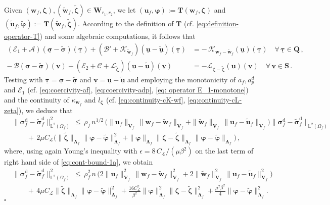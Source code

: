 \documentclass[11pt]{article}
\numberwithin{equation}{section}
\newcommand{\ds}{\displaystyle}
\newcommand{\bLambda}{{\boldsymbol\Lambda}}
\newcommand{\bsi}{{\boldsymbol\sigma}}
\newcommand{\bvarphi}{{\boldsymbol\varphi}}
\newcommand{\btau}{{\boldsymbol\tau}}
\newcommand{\bzeta}{{\boldsymbol\zeta}}
\newcommand{\ubsi}{\underline{\bsi}}
\newcommand{\ubtau}{\underline{\btau}}
\newcommand{\ubu}{\underline{\bu}}
\newcommand{\ubv}{\underline{\bv}}
\newcommand{\bv}{{\mathbf{v}}}
\newcommand{\bw}{{\mathbf{w}}}
\newcommand{\bu}{\mathbf{u}}
\newcommand{\0}{{\mathbf{0}}}
\def\bV{\mathbf{V}}
\def\bW{\mathbf{W}}
\def\bT{\mathbf{T}}
\def\bQ{\mathbf{Q}}
\def\bS{\mathbf{S}}
\newcommand\bbL{\mathbb{L}}
\newcommand{\cA}{\mathcal{A}}
\newcommand{\cB}{\mathcal{B}}
\newcommand{\cC}{\mathcal{C}}
\newcommand{\cE}{\mathcal{E}}
\newcommand{\cK}{\mathcal{K}}
\newcommand{\cL}{\mathcal{L}}
\def\rd{\mathrm{d}}
\def\wt{\widetilde}
\newenvironment{proof}{\noindent{\it Proof.}}{\hfill$\square$}
\numberwithin{equation}{section}
\begin{document}
\begin{proof}
Given $(\bw_f,\bzeta), (\wt{\bw}_f,\wt{\bzeta}) \in \bW_{r_1,r_2}$, we let $(\bu_f,\bvarphi) := \bT(\bw_f,\bzeta)$ and $(\wt{\bu}_f,\wt{\bvarphi}) := \bT(\wt{\bw}_f,\wt{\bzeta})$. 
According to the definition of $\bT$ (cf. \eqref{eq:definition-operator-T}) and some algebraic computations, it follows that
\begin{align}
(\cE_1 + \cA)(\ubsi - \wt{\bsi})(\ubtau) + (\cB' + \cK_{\wt{\bw}_f})(\ubu - \wt{\ubu})(\ubtau) &= -\,\cK_{\bw_f - \wt{\bw}_f}(\ubu)(\ubtau) \quad \forall\,\ubtau\in \bQ\,, \nonumber \\[0.5ex]
\ds -\,\cB(\ubsi - \wt{\ubsi})(\ubv) + (\cE_2 + \cC +\cL_{\wt{\bzeta}})(\ubu - \wt{\ubu})(\ubv) &= -\cL_{\bzeta-\wt{\bzeta}}(\ubu )(\ubv) \quad \forall\,\ubv\in \bS\,. \label{eq:subtracting-auxiliary-problemas-T}
\end{align}
Testing with $\ubtau = \ubsi - \wt{\ubsi}$ and $\ubv = \ubu - \wt{\ubu}$ and employing the monotonicity of $a_f, a^d_p$ and $\cE_1$ (cf. \eqref{eq:coercivity-af}, \eqref{eq:coercivity-adp}, \eqref{eq: operator E_1-monotone}) and the continuity of  $\kappa_{\bw_f}$ and $l_{\bzeta}$ (cf. \eqref{eq:continuity-cK-wf}, \eqref{eq:continuity-cL-zeta}), we deduce that
\begin{align}
& \|\bsi^\rd_f - \wt{\bsi}^\rd_f\|^2_{\bbL^2(\Omega_f)}
\,\leq\, \rho_f\,n^{1/2}\,\Big( \|\bu_f\|_{\bV_f}\,\|\bw_f - \wt{\bw}_f\|_{\bV_f} + \|\wt{\bw}_f\|_{\bV_f}\,\|\bu_f - \wt{\bu}_f\|_{\bV_f} \Big)\|\bsi^\rd_f - \wt{\bsi}^\rd_f\|_{\bbL^2(\Omega_f)} \nonumber \\ 
& \qquad  +\, 2\mu C_{\cL}\Big(\|\wt{\bzeta}\|_{\bLambda_f}\|\bvarphi-\wt{\bvarphi}\|^2_{\bLambda_f}+\|\bvarphi\|_{\bLambda_f}\|\bzeta-\wt{\bzeta}\|_{\bLambda_f} \|\bvarphi-\wt{\bvarphi}\|_{\bLambda_f}\Big)\,, \label{eq:cont-bound-1a}
\end{align}
where, using again Young's inequality with $\epsilon = 8\,C_{\cL}/(\mu\beta^2)$ on the last term of right hand side of \eqref{eq:cont-bound-1a}, we obtain
\begin{align}
&\|\bsi^\rd_f - \wt{\bsi}^\rd_f\|^2_{\bbL^2(\Omega_f)}
\,\leq\, \rho_f^2\,n\,\Big(2 \|\bu_f\|^2_{\bV_f}\,\|\bw_f - \wt{\bw}_f\|^2_{\bV_f} + 2\|\wt{\bw}_f\|^2_{\bV_f}\,\|\bu_f - \wt{\bu}_f\|^2_{\bV_f} \Big) \nonumber \\ 
& \qquad +\, 4\mu C_{\cL}\|\wt{\bzeta}\|_{\bLambda_f}\|\bvarphi-\wt{\bvarphi}\|^2_{\bLambda_f}+\frac{16 C_{\cL}^2}{\beta^2}\|\bvarphi\|^2_{\bLambda_f}\|\bzeta-\wt{\bzeta}\|^2_{\bLambda_f} + \frac{\mu^2\beta^2}{4}\|\bvarphi-\wt{\bvarphi}\|^2_{\bLambda_f}.\label{eq:sigfbound-1}

\end{align}
\end{proof}
\end{document}
